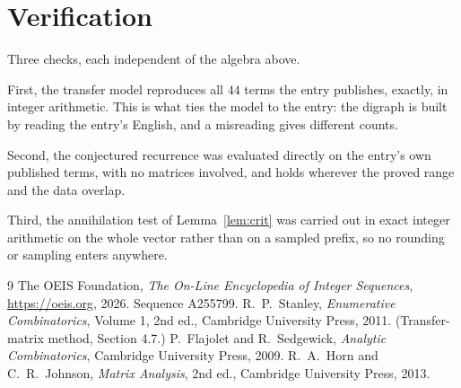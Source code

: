 \documentclass[11pt,a4paper]{article}
\theoremstyle{plain}
\theoremstyle{definition}
\begin{document}
\section{Verification}

Three checks, each independent of the algebra above.

First, the transfer model reproduces all $44$ terms the entry publishes, exactly, in
integer arithmetic. This is what ties the model to the entry: the digraph is built by reading
the entry's English, and a misreading gives different counts.

Second, the conjectured recurrence was evaluated directly on the entry's own published terms,
with no matrices involved, and holds wherever the proved range and the data overlap.

Third, the annihilation test of Lemma~\ref{lem:crit} was carried out in exact integer
arithmetic on the whole vector rather than on a sampled prefix, so no rounding or sampling
enters anywhere.

\begin{thebibliography}{9}
 The OEIS Foundation, \emph{The On-Line Encyclopedia of Integer
Sequences}, \url{https://oeis.org}, 2026. Sequence A255799.
 R.~P.~Stanley, \emph{Enumerative Combinatorics}, Volume 1, 2nd ed.,
Cambridge University Press, 2011. (Transfer-matrix method, Section 4.7.)
 P.~Flajolet and R.~Sedgewick, \emph{Analytic Combinatorics}, Cambridge
University Press, 2009.
 R.~A.~Horn and C.~R.~Johnson, \emph{Matrix Analysis}, 2nd ed., Cambridge
University Press, 2013.
\end{thebibliography}
\end{document}
